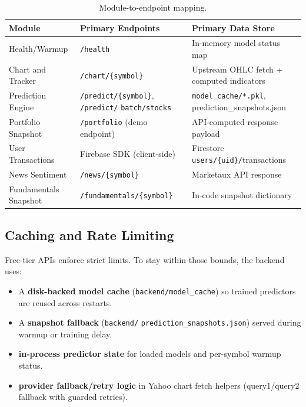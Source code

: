 \documentclass[12pt,a4paper]{report}
\numberwithin{equation}{chapter}
\begin{document}
\begin{table}[H]
\centering
\caption{Module-to-endpoint mapping.}
\label{tab:modmap}
\small
\begin{tabular}{|>{\raggedright\arraybackslash}p{3.8cm}|>{\raggedright\arraybackslash}p{5.8cm}|>{\raggedright\arraybackslash}p{4.4cm}|}
\hline
\textbf{Module} & \textbf{Primary Endpoints} & \textbf{Primary Data Store} \\ \hline
Health/Warmup & \texttt{/health} & In-memory model status map \\ \hline
Chart and Tracker & \texttt{/chart/\{symbol\}} & Upstream OHLC fetch + computed indicators \\ \hline
Prediction Engine & \texttt{/predict/\{symbol\}}, \texttt{/predict/} \texttt{batch/stocks} & \texttt{model\_cache/*.pkl}, prediction\_\allowbreak snapshots.json \\ \hline
Portfolio Snapshot & \texttt{/portfolio} (demo endpoint) & API-computed response payload \\ \hline
User Transactions & Firebase SDK (client-side) & Firestore \texttt{users/\{uid\}/}transactions \\ \hline
News Sentiment & \texttt{/news/\{symbol\}} & Marketaux API response \\ \hline
Fundamentals Snapshot & \texttt{/fundamentals/\{symbol\}} & In-code snapshot dictionary \\ \hline
\end{tabular}
\end{table}

\subsection{Caching and Rate Limiting}

Free-tier APIs enforce strict limits. To stay within those bounds, the backend uses:

\begin{itemize}
  \item A \textbf{disk-backed model cache} (\texttt{backend/model\_cache}) so trained predictors are reused across restarts.
  \item A \textbf{snapshot fallback} (\texttt{backend/} \texttt{prediction\_snapshots.json}) served during warmup or training delay.
  \item \textbf{in-process predictor state} for loaded models and per-symbol warmup status.
  \item \textbf{provider fallback/retry logic} in Yahoo chart fetch helpers (query1/query2 fallback with guarded retries).
\end{itemize}
\end{document}
